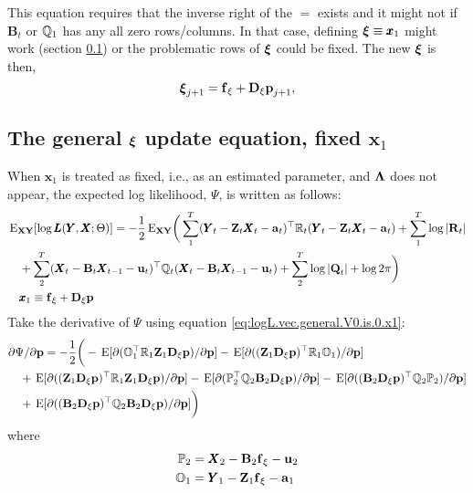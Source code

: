 \documentclass[]{article}
\def\xixi{\mbox{\boldmath $\xi$}}
\def\LAM{\mbox{\boldmath $\Lambda$}}
\def\ZZ{\mbox{$\mathbf Z$}}	\def\zz{\mbox{$\mathbf z$}}
\def\BB{\mbox{$\mathbf B$}}	\def\bb{\mbox{$\mathbf b$}}
\def\DD{\mbox{$\mathbf D$}}	\def\dd{\mbox{$\mathbf d$}}
\def\QQ{\mbox{$\mathbf Q$}}	 \def\qq{\mbox{$\mathbf q$}}
\def\RR{\mbox{$\mathbf R$}}	 \def\rr{\mbox{$\mathbf r$}}
\def\XX{\mbox{$\pmb{X}$}}	\def\xx{\mbox{$\pmb{x}$}}
\def\YY{\mbox{$\pmb{Y}$}}	\def\yy{\mbox{$\pmb{y}$}}
\def\LL{\mbox{$\pmb{L}$}}	\def\ll{\mbox{$\pmb{l}$}}
\def\E{\,\textup{\textrm{E}}}
\def\EXy{\,\textup{\textrm{E}}_{\text{{\bf XY}}}}
\begin{document}
This equation requires that the inverse right of the $=$ exists and it might not if $\BB_t$ or $\mathbb{Q}_1$ has any all zero rows/columns.  In that case, defining $\xixi \equiv \xx_1$ might work (section \ref{sec:general.x1.update}) or the problematic rows of $\xixi$ could be fixed.
The new $\xixi$ is then,
\begin{equation}
\xixi_{j+1} = \ff_\xi + \DD_\xi\pp_{j+1},
\end{equation}

\subsection{The general $\xixi$ update equation, fixed $\xx_1$}\label{sec:general.x1.update}
When $\xx_1$ is treated as fixed, i.e., as an estimated parameter, and $\LAM$ does not appear, the expected log likelihood, $\Psi$, is written as follows:
\begin{equation}\label{eq:logL.vec.general.V0.is.0.x1}
\begin{split}
&\EXy[\log\LL(\YY,\XX ; \Theta)] = -\frac{1}{2}\EXy\bigg(
 \sum_1^T(\YY_t - \ZZ_t\XX_t - \aa_t)^\top \Rm_t (\YY_t - \ZZ_t\XX_t - \aa_t) +\sum_1^T \log |\RR_t|\\
&\quad +\sum_2^T(\XX_t - \BB_t\XX_{t-1} - \uu_t)^\top \Qm_t (\XX_t - \BB_t\XX_{t-1} - \uu_t)
 +\sum_2^T\log |\QQ_t| + \log 2\pi\bigg)\\
&\quad \xx_1 \equiv \ff_\xi+\DD_\xi\pp  
\end{split}
\end{equation}
Take the derivative of $\Psi$ using equation \ref{eq:logL.vec.general.V0.is.0.x1}:
\begin{equation}
\begin{split}
&\partial\Psi/\partial\pp = -\frac{1}{2} \bigg(
-\E[\partial(\mathbb{O}_1^\top\Rm_1\ZZ_1\DD_\xi\pp)/\partial\pp]  -\E[\partial((\ZZ_1\DD_\xi\pp)^\top\Rm_1\mathbb{O}_1)/\partial\pp] \\
&\quad +\E[\partial((\ZZ_1\DD_\xi\pp)^\top\Rm_1\ZZ_1\DD_\xi\pp)/\partial\pp]
 -\E[\partial(\mathbb{P}_2^\top\Qm_2\BB_2\DD_\xi\pp)/\partial\pp]  -\E[\partial((\BB_2\DD_\xi\pp)^\top\Qm_2\mathbb{P}_2)/\partial\pp] \\
&\quad +\E[\partial((\BB_2\DD_\xi\pp)^\top\Qm_2\BB_2\DD_\xi\pp)/\partial\pp]  
\bigg)
\end{split}
\end{equation}
where
\begin{equation}
\begin{split}
\mathbb{P}_2&=\XX_2 - \BB_2\ff_\xi  - \uu_2\\
\mathbb{O}_1&=\YY_1 - \ZZ_1\ff_\xi  - \aa_1\\
\end{split}
\end{equation}
 
\end{document}
